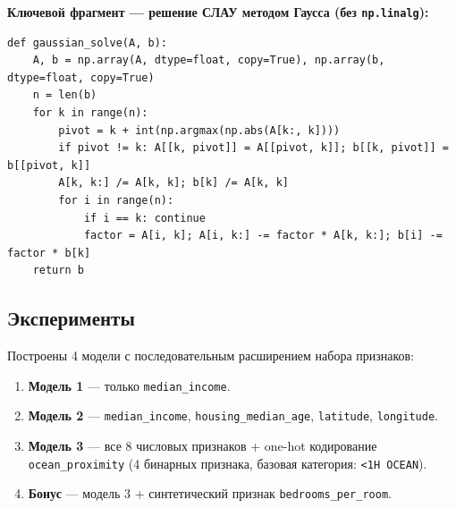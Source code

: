 \documentclass[12pt,a4paper]{article}
\begin{document}

\medskip
\textbf{Ключевой фрагмент — решение СЛАУ методом Гаусса (без \texttt{np.linalg}):}

\begin{lstlisting}[caption={Метод Гаусса с выбором главного элемента},label={lst:gauss}]
def gaussian_solve(A, b):
    A, b = np.array(A, dtype=float, copy=True), np.array(b, dtype=float, copy=True)
    n = len(b)
    for k in range(n):
        pivot = k + int(np.argmax(np.abs(A[k:, k])))
        if pivot != k: A[[k, pivot]] = A[[pivot, k]]; b[[k, pivot]] = b[[pivot, k]]
        A[k, k:] /= A[k, k]; b[k] /= A[k, k]
        for i in range(n):
            if i == k: continue
            factor = A[i, k]; A[i, k:] -= factor * A[k, k:]; b[i] -= factor * b[k]
    return b
\end{lstlisting}

\subsection{Эксперименты}

Построены 4 модели с последовательным расширением набора признаков:

\begin{enumerate}
    \item \textbf{Модель 1} — только \texttt{median\_income}.
    \item \textbf{Модель 2} — \texttt{median\_income},
          \texttt{housing\_median\_age}, \texttt{latitude},
          \texttt{longitude}.
    \item \textbf{Модель 3} — все 8 числовых признаков + one-hot
          кодирование \texttt{ocean\_proximity} (4 бинарных признака,
          базовая категория: \texttt{<1H OCEAN}).
    \item \textbf{Бонус} — модель 3 + синтетический признак
          \texttt{bedrooms\_per\_room}.
\end{enumerate}
\end{document}
